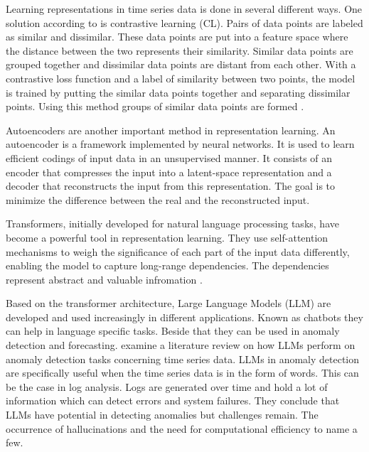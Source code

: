 Learning representations in time series data is done in several different ways. One solution according to \cite{zhang_debiased_2024} is contrastive learning (CL).  Pairs of data points are labeled as similar and dissimilar. These data points are put into a feature space where the distance between the two represents their similarity. Similar data points are grouped together and dissimilar data points are distant from each other. With a contrastive loss function and a label of similarity between two points, the model is trained by putting the similar data points together and separating dissimilar points. Using this method groups of similar data points are formed \cite{shi_trade-off_2023}.

Autoencoders are another important method in representation learning. An autoencoder is a framework implemented by neural networks. It is used to learn efficient codings of input data in an unsupervised manner. It consists of an encoder that compresses the input into a latent-space representation and a decoder that reconstructs the input from this representation. The goal is to minimize the difference between the real and the reconstructed input.

Transformers, initially developed for natural language processing tasks, have become a powerful tool in representation learning. They use self-attention mechanisms to weigh the significance of each part of the input data differently, enabling the model to capture long-range dependencies. The dependencies represent abstract and valuable infromation \cite{vaswani_attention_2017}.

Based on the transformer architecture, Large Language Models (LLM) are developed and used increasingly in different applications. Known as chatbots they can help in language specific tasks. Beside that they can be used in anomaly detection and forecasting. \cite{su_large_2024} examine a literature review on how LLMs perform on anomaly detection tasks concerning time series data. LLMs in anomaly detection are specifically useful when the time series data is in the form of words. This can be the case in log analysis. Logs are generated over time and hold a lot of information which can detect errors and system failures. They conclude that LLMs have potential in detecting anomalies but challenges remain. The occurrence of hallucinations and the need for computational efficiency to name a few.

